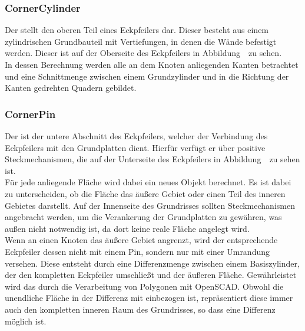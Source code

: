\subsubsection{CornerCylinder}
Der  stellt den oberen Teil eines Eckpfeilers dar.
Dieser besteht aus einem zylindrischen Grundbauteil mit Vertiefungen, in denen die Wände befestigt werden.
Dieser ist auf der Oberseite des Eckpfeilers in Abbildung~\thebildnr\ zu sehen. \\
In dessen Berechnung werden alle an dem Knoten anliegenden Kanten betrachtet und eine Schnittmenge zwischen einem Grundzylinder und in die Richtung der Kanten gedrehten Quadern gebildet.
\subsubsection{CornerPin}
Der  ist der untere Abschnitt des Eckpfeilers, welcher der Verbindung des Eckpfeilers mit den Grundplatten dient.
Hierfür verfügt er über positive Steckmechanismen, die auf der Unterseite des Eckpfeilers in Abbildung~\thebildnr\ zu sehen ist. \\
Für jede anliegende Fläche wird dabei ein neues Objekt berechnet.
Es ist dabei zu unterscheiden, ob die Fläche das äußere Gebiet oder einen Teil des inneren Gebietes darstellt.
Auf der Innenseite des Grundrisses sollten Steckmechanismen angebracht werden, um die Verankerung der Grundplatten zu gewähren, was außen nicht notwendig ist, da dort keine reale Fläche angelegt wird.\\ %
Wenn an einen Knoten das äußere Gebiet angrenzt, wird der entsprechende Eckpfeiler dessen nicht mit einem Pin, sondern nur mit einer Umrandung versehen.
Diese entsteht durch eine Differenzmenge zwischen einem Basiszylinder, der den kompletten Eckpfeiler umschließt und der äußeren Fläche.
Gewährleistet wird das durch die Verarbeitung von Polygonen mit OpenSCAD.
Obwohl die unendliche Fläche in der Differenz mit einbezogen ist, repräsentiert diese immer auch den kompletten inneren Raum des Grundrisses, so dass eine Differenz möglich ist.\\

